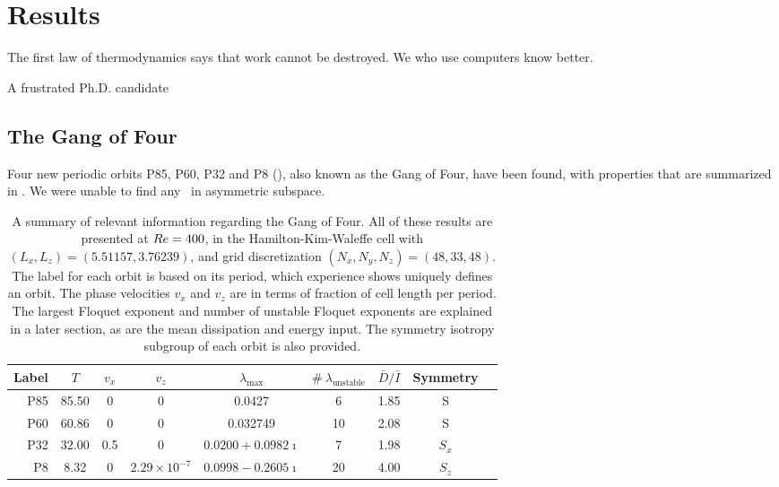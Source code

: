 \chapter{Results}
\epigraph{The first law of thermodynamics says that work cannot be destroyed. We who use computers know better.}{A frustrated Ph.D. candidate}

\section{The Gang of Four}

Four new periodic orbits P85, P60, P32 and P8 (), also known as the Gang of Four, have been found, with properties that are summarized in .  We were unable to find any \ecs\ in asymmetric subspace. 

\begin{table}[h!]
\caption{A summary of relevant information regarding the Gang of Four. All of these results are presented at $Re = 400$, in the Hamilton-Kim-Waleffe cell with $(L_x,L_z) = (5.51157, 3.76239)$, and grid discretization $(N_x,N_y,N_z)= (48,33,48)$. The label for each orbit is based on its period, which experience shows uniquely defines an orbit. The phase velocities $v_x$ and $v_z$ are in terms of fraction of cell length per period. The largest Floquet exponent and number of unstable Floquet exponents are explained in a later section, as are the mean dissipation and energy input. The symmetry isotropy subgroup of each orbit is also provided. }   \label{tab:summary}
\begin{center}
\begin{tabular}{r   c  c  c  c  c  c  c  l }
\toprule
Label & $T$ & $v_x$ & $v_z$ &  $\lambda_{\textrm{max}}$ & $\#\ \lambda_{\textrm{unstable}}$ & $\bar{D}/\bar{I}$&  Symmetry \\
\midrule
\midrule
P85 & 85.50 & 0 & 0 & 0.0427 & 6 &1.85 & S\\

P60 & 60.86 & 0 & 0 &  0.032749 & 10 & 2.08 & S\\

P32 & 32.00 & 0.5 & 0 &  $0.0200 + 0.0982\imath$ & 7& 1.98 &$S_x$\\

P8 & 8.32 & 0 & $2.29\times 10^{-7}$ & $0.0998 - 0.2605 \imath$ &20& 4.00& $S_z$\\
\bottomrule
\end{tabular}
\end{center}
\end{table}
